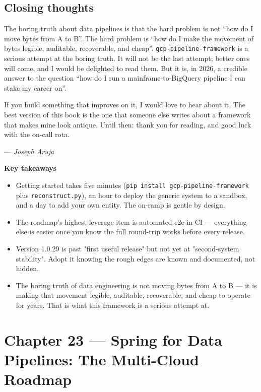 \documentclass[
  11pt,
  british,
  oneside]{book}
\begin{document}
\hypertarget{closing-thoughts}{%
\section{Closing thoughts}\label{closing-thoughts}}

The boring truth about data pipelines is that the hard problem is not
``how do I move bytes from A to B''. The hard problem is ``how do I make
the movement of bytes legible, auditable, recoverable, and cheap''.
\texttt{gcp-pipeline-framework} is a serious attempt at the boring
truth. It will not be the last attempt; better ones will come, and I
would be delighted to read them. But it is, in 2026, a credible answer
to the question ``how do I run a mainframe-to-BigQuery pipeline I can
stake my career on''.

If you build something that improves on it, I would love to hear about
it. The best version of this book is the one that someone else writes
about a framework that makes mine look antique. Until then: thank you
for reading, and good luck with the on-call rota.

--- \emph{Joseph Aruja}

\begin{takeaways}
\textbf{Key takeaways}
\begin{itemize}
  \item Getting started takes five minutes (\texttt{pip install gcp-pipeline-framework} plus \texttt{reconstruct.py}), an hour to deploy the generic system to a sandbox, and a day to add your own entity. The on-ramp is gentle by design.
  \item The roadmap's highest-leverage item is automated e2e in CI — everything else is easier once you know the full round-trip works before every release.
  \item Version 1.0.29 is past "first useful release" but not yet at "second-system stability". Adopt it knowing the rough edges are known and documented, not hidden.
  \item The boring truth of data engineering is not moving bytes from A to B — it is making that movement legible, auditable, recoverable, and cheap to operate for years. That is what this framework is a serious attempt at.
\end{itemize}
\end{takeaways}

\newpage

\hypertarget{chapter-23-spring-for-data-pipelines-the-multi-cloud-roadmap}{%
\chapter{Chapter 23 --- Spring for Data Pipelines: The Multi-Cloud
Roadmap}\label{chapter-23-spring-for-data-pipelines-the-multi-cloud-roadmap}}
\end{document}
